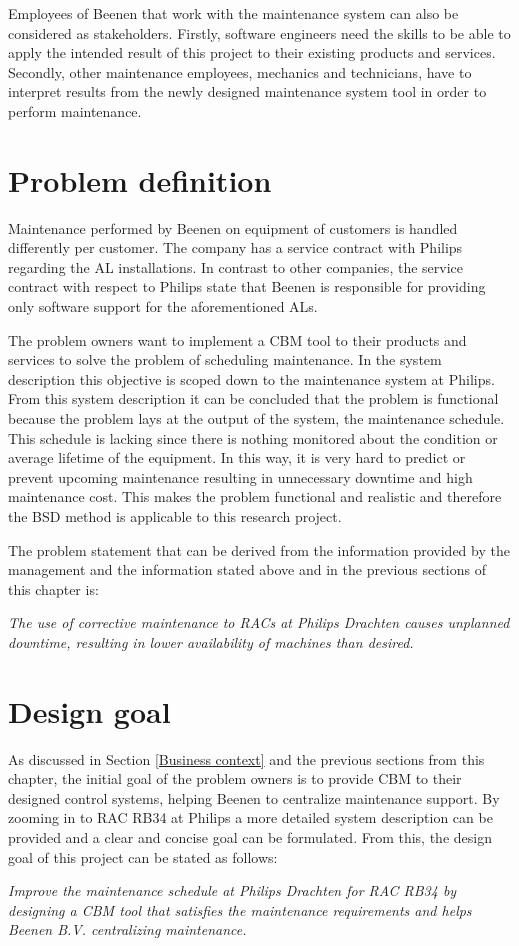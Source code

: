 Employees of Beenen that work with the maintenance system can also be considered as stakeholders. Firstly, software engineers need the skills to be able to apply the intended result of this project to their existing products and services. Secondly, other maintenance employees, mechanics and technicians, have to interpret results from the newly designed maintenance system tool in order to perform maintenance. 

\section{Problem definition} \label{Problem definition}
Maintenance performed by Beenen on equipment of customers is handled differently per customer. The company has a service contract with Philips regarding the AL installations. In contrast to other companies, the service contract with respect to Philips state that Beenen is responsible for providing only software support for the aforementioned ALs.  

The problem owners want to implement a CBM tool to their products and services to solve the problem of scheduling maintenance. In the system description this objective is scoped down to the maintenance system at Philips. From this system description it can be concluded that the problem is functional because the problem lays at the output of the system, the maintenance schedule. This schedule is lacking since there is nothing monitored about the condition or average lifetime of the equipment. In this way, it is very hard to predict or prevent upcoming maintenance resulting in unnecessary downtime and high maintenance cost. This makes the problem functional and realistic and therefore the BSD method is applicable to this research project.

The problem statement that can be derived from the information provided by the management and the information stated above and in the previous sections of this chapter is:
\begin{center}
\textit{The use of corrective maintenance to RACs at Philips Drachten causes unplanned downtime, resulting in lower availability of machines than desired.}\\
\end{center}

\section{Design goal} \label{Design goal}
As discussed in Section \ref{Business context} and the previous sections from this chapter, the initial goal of the problem owners is to provide CBM to their designed control systems, helping Beenen to centralize maintenance support. By zooming in to RAC RB34 at Philips a more detailed system description can be provided and a clear and concise goal can be formulated. From this, the design goal of this project can be stated as follows:
\begin{center}
\textit{Improve the maintenance schedule at Philips Drachten for RAC RB34 by designing a CBM tool that satisfies the maintenance requirements and helps Beenen B.V. centralizing maintenance.}\\
\end{center}

